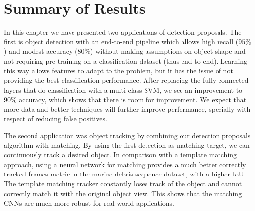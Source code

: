 \section{Summary of Results}

In this chapter we have presented two applications of detection proposals. The first is object detection with an end-to-end pipeline which allows high recall ($95 \%$) and modest accuracy ($80 \%$) without making assumptions on object shape and not requiring pre-training on a classification dataset (thus end-to-end). Learning this way allows features to adapt to the problem, but it has the issue of not providing the best classification performance.
After replacing the fully connected layers that do classification with a multi-class SVM, we see an improvement to $90 \%$ accuracy, which shows that there is room for improvement. We expect that more data and better techniques will further improve performance, specially with respect of reducing false positives.

The second application was object tracking by combining our detection proposals algorithm with matching. By using the first detection as matching target, we can continuously track a desired object. In comparison with a template matching approach, using a neural network for matching provides a much better correctly tracked frames metric in the marine debris sequence dataset, with a higher IoU. The template matching tracker constantly loses track of the object and cannot correctly match it with the original object view. This shows that the matching CNNs are much more robust for real-world applications.

